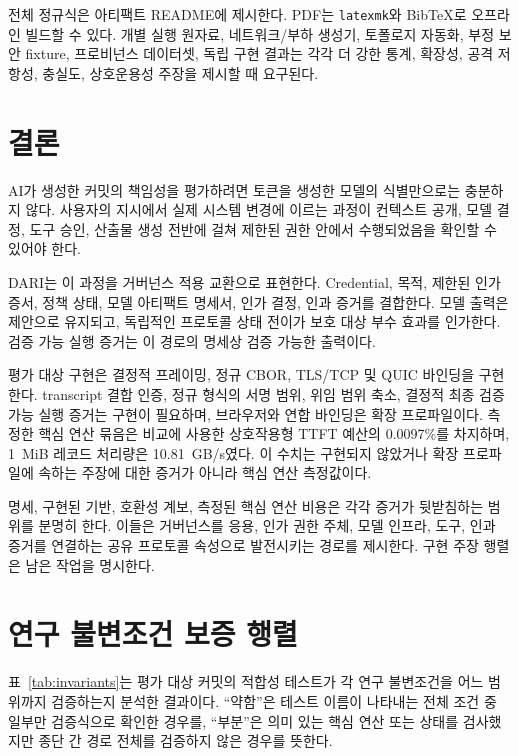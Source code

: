 \documentclass[10pt]{article}
\begin{document}
전체 정규식은 아티팩트 README에 제시한다. PDF는 \texttt{latexmk}와 BibTeX로 오프라인 빌드할 수 있다. 개별 실행 원자료, 네트워크/부하 생성기, 토폴로지 자동화, 부정 보안 fixture, 프로비넌스 데이터셋, 독립 구현 결과는 각각 더 강한 통계, 확장성, 공격 저항성, 충실도, 상호운용성 주장을 제시할 때 요구된다.

\section{결론}

AI가 생성한 커밋의 책임성을 평가하려면 토큰을 생성한 모델의 식별만으로는 충분하지 않다. 사용자의 지시에서 실제 시스템 변경에 이르는 과정이 컨텍스트 공개, 모델 결정, 도구 승인, 산출물 생성 전반에 걸쳐 제한된 권한 안에서 수행되었음을 확인할 수 있어야 한다.

DARI는 이 과정을 거버넌스 적용 교환으로 표현한다. Credential, 목적, 제한된 인가 증서, 정책 상태, 모델 아티팩트 명세서, 인가 결정, 인과 증거를 결합한다. 모델 출력은 제안으로 유지되고, 독립적인 프로토콜 상태 전이가 보호 대상 부수 효과를 인가한다. 검증 가능 실행 증거는 이 경로의 명세상 검증 가능한 출력이다.

평가 대상 구현은 결정적 프레이밍, 정규 CBOR, TLS/TCP 및 QUIC 바인딩을 구현한다. transcript 결합 인증, 정규 형식의 서명 범위, 위임 범위 축소, 결정적 최종 검증 가능 실행 증거는 구현이 필요하며, 브라우저와 연합 바인딩은 확장 프로파일이다. 측정한 핵심 연산 묶음은 비교에 사용한 상호작용형 TTFT 예산의 0.0097\%를 차지하며, 1~MiB 레코드 처리량은 10.81~GB/s였다. 이 수치는 구현되지 않았거나 확장 프로파일에 속하는 주장에 대한 증거가 아니라 핵심 연산 측정값이다.

명세, 구현된 기반, 호환성 계보, 측정된 핵심 연산 비용은 각각 증거가 뒷받침하는 범위를 분명히 한다. 이들은 거버넌스를 응용, 인가 권한 주체, 모델 인프라, 도구, 인과 증거를 연결하는 공유 프로토콜 속성으로 발전시키는 경로를 제시한다. 구현 주장 행렬은 남은 작업을 명시한다.

{\latinaccentfont


}

\clearpage
\onecolumn
\appendix
\section{연구 불변조건 보증 행렬}

\noindent 표~\ref{tab:invariants}는 평가 대상 커밋의 적합성 테스트가 각 연구 불변조건을 어느 범위까지 검증하는지 분석한 결과이다. ``약함''은 테스트 이름이 나타내는 전체 조건 중 일부만 검증식으로 확인한 경우를, ``부분''은 의미 있는 핵심 연산 또는 상태를 검사했지만 종단 간 경로 전체를 검증하지 않은 경우를 뜻한다.
\end{document}

